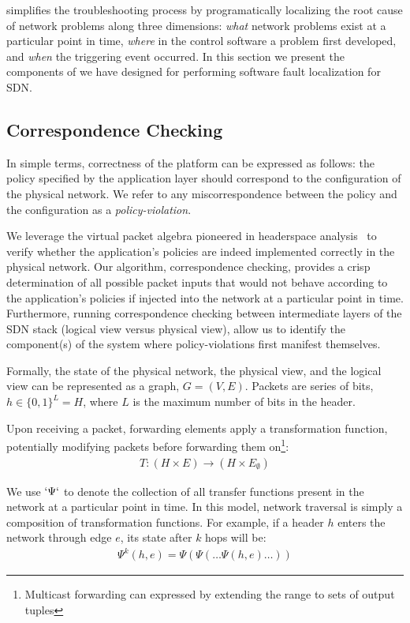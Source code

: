 \projectname{} simplifies the troubleshooting process by programatically localizing the root cause
of network problems along three dimensions: {\it what} network problems exist at a
particular point in time, {\it where} in the control software a problem first developed, and
{\it when} the triggering event occurred. In this section we present 
the components of \projectname{} we have designed for performing software fault localization for SDN.

\subsection{Correspondence Checking}

In simple terms, correctness of the platform can be expressed as follows:
the policy specified by the application layer should correspond to the
configuration of the physical network. We refer to any miscorrespondence
between the policy and the configuration as a {\it policy-violation}.

We leverage the virtual packet algebra pioneered in headerspace
analysis~\cite{hsa} to verify whether the application's policies are indeed
implemented correctly in the physical network. Our algorithm, correspondence
checking, provides a crisp determination of all possible packet inputs that
would not behave according to the application's policies if injected into the
network at a particular point in time. Furthermore, running correspondence
checking between intermediate layers of the SDN stack (logical view versus
physical view), allow us to identify the component(s) of
the system where policy-violations first manifest themselves.

Formally, the state of the physical network, the physical view, and the
logical view can be represented as a graph,
$G = (V, E)$. Packets are series of bits, $h \in \{0,1\}^L = H$,
where $L$ is the maximum number of bits in the header.

Upon receiving a packet,
forwarding elements apply a transformation function, potentially modifying
packets before forwarding them on\footnote{Multicast forwarding can expressed
by extending the range to sets of output tuples}:
\begin{align*}
T: (H \times E) \rightarrow (H \times E_{\emptyset})
\end{align*}

We use $`\Psi`$ to denote the collection of all transfer functions present in
the network at a particular point in time. In this model, network traversal is simply a composition of transformation
functions. For example, if a header $h$ enters the network through edge
$e$, its state after $k$ hops will be:
\begin{align*}
\Psi^k(h,e) = \Psi(\Psi(\dots \Psi(h,e)\dots))
\end{align*}

